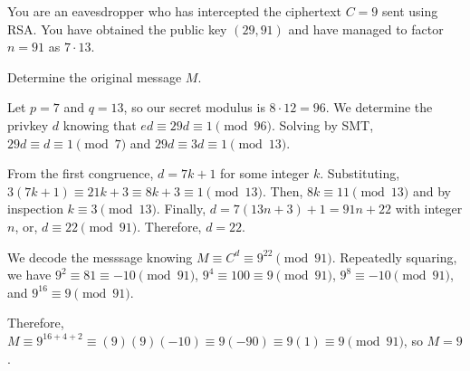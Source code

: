 \begin{prob}
  You are an eavesdropper who has intercepted the ciphertext $C = 9$ sent using RSA\@.
  You have obtained the public key $(29, 91)$ and have managed to factor $n = 91$ as $7 \cdot 13$.

  Determine the original message $M$.
\end{prob}
\begin{sol}
  Let $p = 7$ and $q = 13$, so our secret modulus is $8 \cdot 12 = 96$.
  We determine the privkey $d$ knowing that $ed \equiv 29d \equiv 1 \pmod{96}$.
  Solving by SMT, $29d \equiv d \equiv 1 \pmod{7}$ and $29d \equiv 3d \equiv 1 \pmod{13}$.

  From the first congruence, $d = 7k + 1$ for some integer $k$.
  Substituting, $3(7k+1) \equiv 21k + 3 \equiv 8k + 3 \equiv 1 \pmod{13}$.
  Then, $8k \equiv 11 \pmod{13}$ and by inspection $k \equiv 3 \pmod{13}$.
  Finally, $d = 7(13n + 3) + 1 = 91n + 22$ with integer $n$, or, $d \equiv 22 \pmod{91}$.
  Therefore, $d = 22$.

  We decode the messsage knowing $M \equiv C^d \equiv 9^{22} \pmod{91}$.
  Repeatedly squaring, we have $9^2 \equiv 81 \equiv -10 \pmod{91}$,
  $9^4 \equiv 100 \equiv 9 \pmod{91}$, $9^8 \equiv -10 \pmod{91}$, and $9^{16} \equiv 9 \pmod{91}$.

  Therefore, $M \equiv 9^{16+4+2} \equiv (9)(9)(-10) \equiv 9(-90) \equiv 9(1) \equiv 9 \pmod{91}$, so $M = 9$.
\end{sol}

